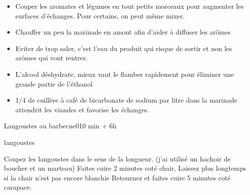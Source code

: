 {\renewcommand{\section}[1]{}

\section{Optimiser une marinade}
\begin{itemize}
\item Couper les aromates et légumes en tout petits morceaux pour augmenter les surfaces d'échanges. Pour certains, on peut même mixer. 
\item Chauffer un peu la marinade en amont afin d'aider à diffuser les arômes
\item Eviter de trop saler, c'est l'eau du produit qui risque de sortir et non les arômes qui vont rentrer. 
\item L'alcool déshydrate, mieux vaut le flamber rapidement pour éliminer une grande partie de l'éthanol
\item 1/4 de cuillère à café  de bicarbonate de sodium par litre dans la marinade attendrit les viandes et favorise les échanges. 
\end{itemize}

\section{Langoustes au barbecue}
\begin{recette}{Langoustes au barbecue}{0}{10 min + 6h}{}
\begin{ingredients}
\ingredient langoustes
\end{ingredients}

\begin{preparation}
\etape Coupez les langoustes dans le sens de la longueur. (j'ai utilisé un hachoir de boucher et un marteau)
\etape Faites cuire 2 minutes coté chair, Laissez plus longtemps si la chair n'est pas encore blanchie
\etape Retournez et faites cuire 5 minutes coté carapace.
\end{preparation}
\end{recette}



}
